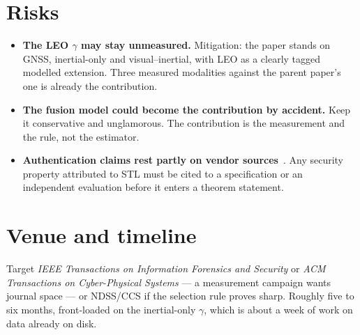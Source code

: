 \documentclass[11pt,a4paper]{article}
\begin{document}
\section{Risks}
\begin{itemize}
\item \textbf{The LEO $\gamma$ may stay unmeasured.} Mitigation: the paper
stands on GNSS, inertial-only and visual--inertial, with LEO as a clearly
tagged modelled extension. Three measured modalities against the parent paper's
one is already the contribution.
\item \textbf{The fusion model could become the contribution by accident.} Keep
it conservative and unglamorous. The contribution is the measurement and the
rule, not the estimator.
\item \textbf{Authentication claims rest partly on vendor
sources}~\cite{groundcontrol_apnt}. Any security property attributed to STL must
be cited to a specification or an independent evaluation before it enters a
theorem statement.
\end{itemize}

\section{Venue and timeline}
Target \emph{IEEE Transactions on Information Forensics and Security} or
\emph{ACM Transactions on Cyber-Physical Systems} --- a measurement campaign
wants journal space --- or NDSS/CCS if the selection rule proves sharp.
Roughly five to six months, front-loaded on the inertial-only $\gamma$, which is
about a week of work on data already on disk.

\small


\end{document}
